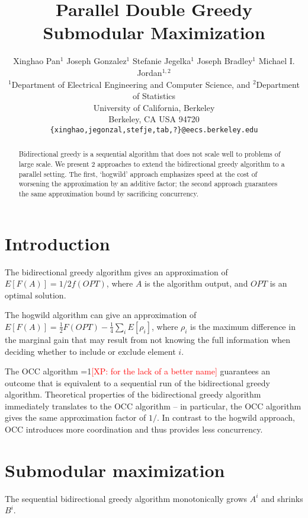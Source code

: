\documentclass{article} %
\title{Parallel Double Greedy Submodular Maximization}
\author{
Xinghao Pan$^1$ Joseph Gonzalez$^1$ Stefanie Jegelka$^1$ Joseph Bradley$^{1}$ Michael I. Jordan$^{1,2}$\\
$^1$Department of Electrical Engineering and Computer Science, and $^2$Department of Statistics\\
University of California, Berkeley\\
Berkeley, CA USA 94720\\
  \texttt{\{xinghao,jegonzal,stefje,tab,?\}@eecs.berkeley.edu} \\
}
\newcommand{\Comments}{1}
\newcommand{\note}[2]{\ifnum\Comments=1\textcolor{#1}{#2}\fi}
\newcommand{\xinghao}[1]{\note{red}{[XP: #1]}}
\begin{document}
\maketitle


\begin{abstract}
Bidirectional greedy is a sequential algorithm that does not scale well to problems of large scale.
We present 2 approaches to extend the bidirectional greedy algorithm to a parallel setting.
The first, `hogwild' approach emphasizes speed at the cost of worsening the approximation by an additive factor;
the second approach guarantees the same approximation bound by sacrificing concurrency.
\end{abstract}

\section{Introduction}
The bidirectional greedy algorithm \cite{buchbinder2012} gives an approximation of $E[F(A)] = 1/2 f(OPT)$, where $A$ is the algorithm output, and $OPT$ is an optimal solution.

The hogwild algorithm can give an approximation of $E[F(A)] = \frac{1}{2} F(OPT) - \frac{1}{4}\sum_iE[\rho_i]$, where $\rho_i$ is the maximum difference in the marginal gain that may result from not knowing the full information when deciding whether to include or exclude element $i$.

The OCC algorithm \xinghao{for the lack of a better name} guarantees an outcome that is equivalent to a sequential run of the bidirectional greedy algorithm.
Theoretical properties of the bidirectional greedy algorithm immediately translates to the OCC algorithm -- in particular, the OCC algorithm gives the same approximation factor of $1/$.
In contrast to the hogwild approach, OCC introduces more coordination and thus provides less concurrency.











\section{Submodular maximization}

The sequential bidirectional greedy \cite{buchbinder2012} algorithm monotonically grows $A^i$ and shrinks $B^i$.
\end{document}
